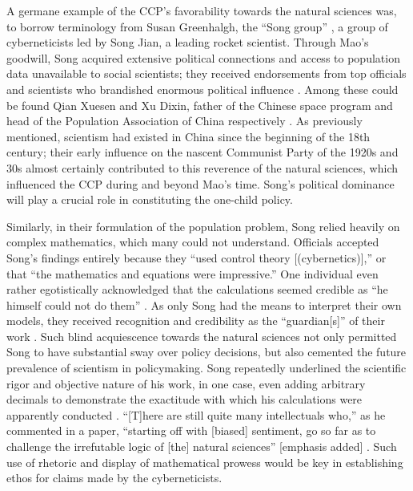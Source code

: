 \documentclass[12pt, a4paper, twoside]{article}
\begin{document}
A germane example of the CCP’s favorability towards the natural sciences was, to borrow terminology from Susan Greenhalgh, the “Song group” \autocite{Greenhalgh2008JustOneChild}, a group of cyberneticists led by Song Jian, a leading rocket scientist. Through Mao’s goodwill, Song acquired extensive political connections and access to population data unavailable to social scientists; they received endorsements from top officials and scientists who brandished enormous political influence \autocite[p.\ 140]{Greenhalgh2008JustOneChild}. Among these could be found Qian Xuesen and Xu Dixin, father of the Chinese space program and head of the Population Association of China respectively \autocite[p.\ 243]{Greenhalgh2008JustOneChild}. As previously mentioned, scientism had existed in China since the beginning of the 18th century; their early influence on the nascent Communist Party of the 1920s and 30s almost certainly contributed to this reverence of the natural sciences, which influenced the CCP during and beyond Mao’s time. Song’s political dominance will play a crucial role in constituting the one-child policy.

Similarly, in their formulation of the population problem, Song relied heavily on complex mathematics, which many could not understand. Officials accepted Song’s findings entirely because they “used control theory [(cybernetics)],” or that “the mathematics and equations were impressive.” One individual even rather egotistically acknowledged that the calculations seemed credible as “he himself could not do them” \autocite[p.\ 246]{Greenhalgh2008JustOneChild}. As only Song had the means to interpret their own models, they received recognition and credibility as the “guardian[s]” of their work \autocite[p.\ 294]{CaidenWildavsky1980}. Such blind acquiescence towards the natural sciences not only permitted Song to have substantial sway over policy decisions, but also cemented the future prevalence of scientism in policymaking. Song repeatedly underlined the scientific rigor and objective nature of his work, in one case, even adding arbitrary decimals to demonstrate the exactitude with which his calculations were apparently conducted \autocite[p.\ 218]{Greenhalgh2008JustOneChild}. “[T]here are still quite many intellectuals who,” as he commented in a paper, “starting off with [biased] sentiment, go so far as to challenge the irrefutable logic of [the] natural sciences” [emphasis added] \autocite{Song1985SystemsScienceReforms}. Such use of rhetoric and display of mathematical prowess would be key in establishing ethos for claims made by the cyberneticists.
\end{document}
